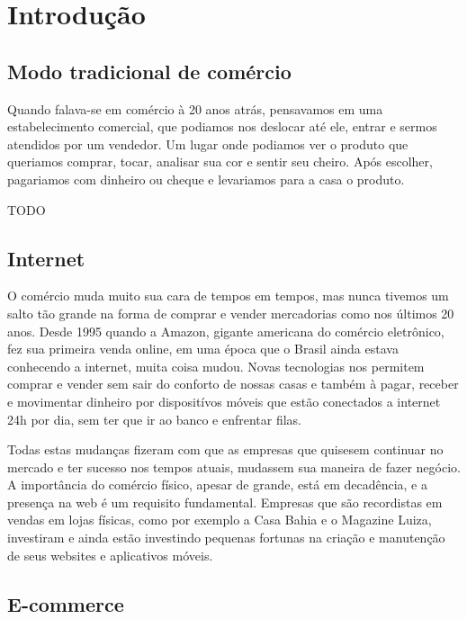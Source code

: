 \chapter{Introdução}

\section{Modo tradicional de comércio}

Quando falava-se em comércio à 20 anos atrás, pensavamos em uma estabelecimento comercial, que podiamos nos deslocar até ele, entrar e sermos atendidos por um vendedor. Um lugar onde podiamos ver o produto que queriamos comprar, tocar, analisar sua cor e sentir seu cheiro. Após escolher, pagariamos com dinheiro ou cheque e levariamos para a casa o produto.

TODO

\section{Internet}

O comércio muda muito sua cara de tempos em tempos, mas nunca tivemos um salto tão grande na forma de comprar e vender mercadorias como nos últimos 20 anos. Desde 1995 quando a Amazon, gigante americana do comércio eletrônico, fez sua primeira venda online, em uma época que o Brasil ainda estava conhecendo a internet, muita coisa mudou. Novas tecnologias nos permitem comprar e vender sem sair do conforto de nossas casas e também à pagar, receber e movimentar dinheiro por dispositívos móveis que estão conectados a internet 24h por dia, sem ter que ir ao banco e enfrentar filas.

Todas estas mudanças fizeram com que as empresas que quisesem continuar no mercado e ter sucesso nos tempos atuais, mudassem sua maneira de fazer negócio. A importância do comércio físico, apesar de grande, está em decadência, e a presença na web é um requisito fundamental. Empresas que são recordistas em vendas em lojas físicas, como por exemplo a Casa Bahia e o Magazine Luiza, investiram e ainda estão investindo pequenas fortunas na criação e manutenção de seus websites e aplicativos móveis.

\section{E-commerce}


